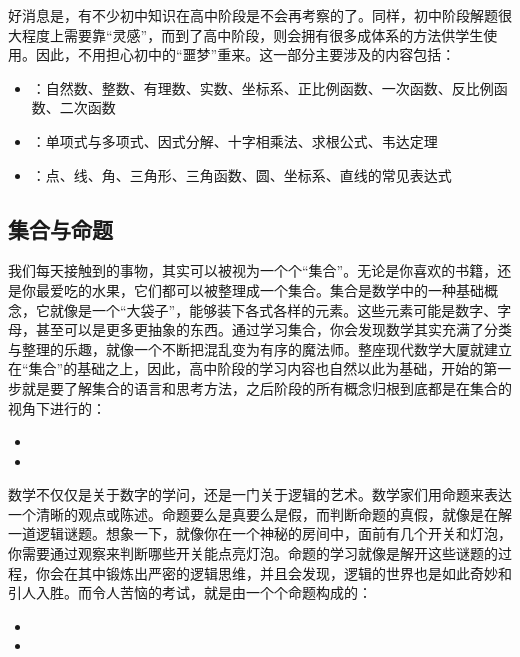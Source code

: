 好消息是，有不少初中知识在高中阶段是不会再考察的了。同样，初中阶段解题很大程度上需要靠“灵感”，而到了高中阶段，则会拥有很多成体系的方法供学生使用。因此，不用担心初中的“噩梦”重来。这一部分主要涉及的内容包括：

\begin{itemize}
\item {}：自然数、整数、有理数、实数、坐标系、正比例函数、一次函数、反比例函数、二次函数
\item {}：单项式与多项式、因式分解、十字相乘法、求根公式、韦达定理
\item {}：点、线、角、三角形、三角函数、圆、坐标系、直线的常见表达式
\end{itemize}


\subsection{集合与命题}

我们每天接触到的事物，其实可以被视为一个个“集合”。无论是你喜欢的书籍，还是你最爱吃的水果，它们都可以被整理成一个集合。集合是数学中的一种基础概念，它就像是一个“大袋子”，能够装下各式各样的元素。这些元素可能是数字、字母，甚至可以是更多更抽象的东西。通过学习集合，你会发现数学其实充满了分类与整理的乐趣，就像一个不断把混乱变为有序的魔法师。整座现代数学大厦就建立在“集合”的基础之上，因此，高中阶段的学习内容也自然以此为基础，开始的第一步就是要了解集合的语言和思考方法，之后阶段的所有概念归根到底都是在集合的视角下进行的：

\begin{itemize}
\item {}
\item {}
\end{itemize}

数学不仅仅是关于数字的学问，还是一门关于逻辑的艺术。数学家们用命题来表达一个清晰的观点或陈述。命题要么是真要么是假，而判断命题的真假，就像是在解一道逻辑谜题。想象一下，就像你在一个神秘的房间中，面前有几个开关和灯泡，你需要通过观察来判断哪些开关能点亮灯泡。命题的学习就像是解开这些谜题的过程，你会在其中锻炼出严密的逻辑思维，并且会发现，逻辑的世界也是如此奇妙和引人入胜。而令人苦恼的考试，就是由一个个命题构成的：

\begin{itemize}
\item {}
\item {}
\end{itemize}

